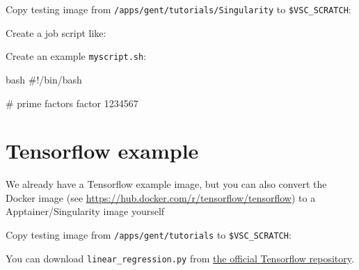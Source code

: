 Copy testing image from \lstinline|/apps/gent/tutorials/Singularity| to \lstinline|$VSC_SCRATCH|:

\begin{prompt}
\end{prompt}

Create a job script like:


Create an example \lstinline|myscript.sh|:

\begin{code}{bash}
#!/bin/bash

# prime factors
factor 1234567
\end{code}

\section{Tensorflow example}

We already have a Tensorflow example image, but you can also convert the Docker
image (see \url{https://hub.docker.com/r/tensorflow/tensorflow}) to a Apptainer/Singularity image yourself

Copy testing image from \lstinline|/apps/gent/tutorials| to \lstinline|$VSC_SCRATCH|:

\begin{prompt}
\end{prompt}


You can download \lstinline|linear_regression.py| from
\href{https://github.com/tensorflow/tensorflow/blob/r1.12/tensorflow/examples/get_started/regression/linear_regression.py}{the official Tensorflow repository}.

